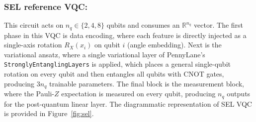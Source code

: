 \documentclass[runningheads]{llncs}
\begin{document}
\subsubsection{SEL reference VQC: } This circuit acts on $n_q \in \{2, 4, 8\}$ qubits and consumes an $\mathbb{R}^{n_q}$ vector. The first phase in this VQC is data encoding, where each feature is directly injected as a single-axis rotation $R_X(x_i)$ on qubit $i$ (angle embedding). Next is the variational ansatz, where a single variational layer of PennyLane's \texttt{StronglyEntanglingLayers} is applied, which places a general single-qubit rotation on every qubit and then entangles all qubits with CNOT gates, producing $3 n_q$ trainable parameters. The final block is the measurement block, where the Pauli-$Z$ expectation is measured on every qubit, producing $n_q$ outputs for the post-quantum linear layer. The diagrammatic representation of SEL VQC is provided in Figure~\ref{fig:sel}.
\end{document}
